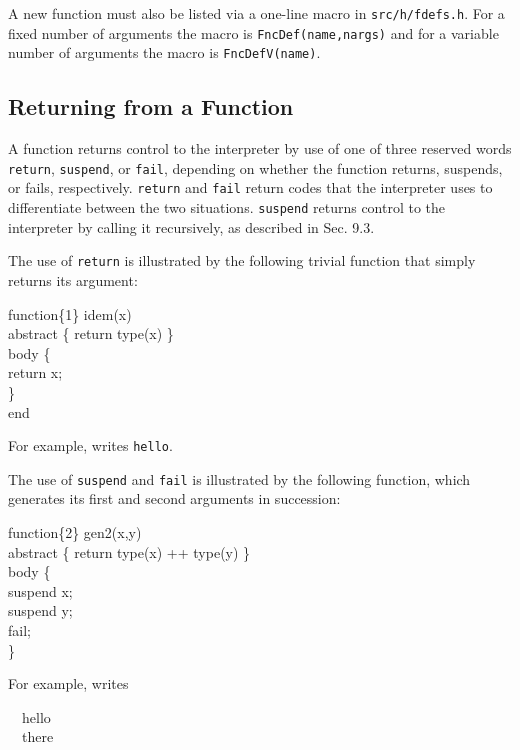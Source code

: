 A new function must also be listed via a one-line macro in
\texttt{src/h/fdefs.h}. For a fixed number of arguments the macro is
\texttt{FncDef(name,nargs)} and for a variable number of arguments
the macro is \texttt{FncDefV(name)}.

\subsection{Returning from a Function}

A function returns control to the interpreter by use of one of three
reserved words
\texttt{return}, \texttt{suspend}, or \texttt{fail}, depending on whether the
function returns, suspends, or fails, respectively. \texttt{return} and
\texttt{fail} return codes that the interpreter uses to differentiate between
the two situations. \texttt{suspend} returns control to the interpreter by
calling it recursively, as described in Sec. 9.3.

The use of \texttt{return} is illustrated by the following trivial function
that simply returns its argument:
\goodbreak
\begin{iconcode}
function\{1\} idem(x)\\
abstract \{ return type(x) \} \\
body \{\\
\>return x;\\
\> \} \\
end
\end{iconcode}
\noindent
For example,
\noindent writes \texttt{hello}.

The use of \texttt{suspend} and \texttt{fail} is illustrated by the
following function, which generates its first and second arguments in
succession:
\goodbreak
\begin{iconcode}
function\{2\} gen2(x,y)\\
abstract \{ return type(x) ++ type(y) \} \\
body \{\\
\>suspend x;\\
\>suspend y;\\
\>fail;\\
\}
\end{iconcode}
\noindent
For example,
\noindent
writes
\goodbreak
\begin{iconcode}
\ \ hello\\
\ \ there
\end{iconcode}

